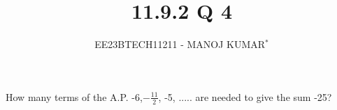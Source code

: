 \documentclass[journal,12pt,twocolumn]{IEEEtran}
\theoremstyle{remark}
\begin{document}

\vspace{3cm}

\title{11.9.2 Q 4}
\author{EE23BTECH11211 - MANOJ KUMAR$^{*}$%
}
\maketitle
\newpage
\bigskip

\renewcommand{\thefigure}{\theenumi}
\renewcommand{\thetable}{\theenumi}



How many terms of the A.P. -6,$-\frac{11}{2}$, -5, ..... are needed to give the sum -25?\\

\solution\\
\fi

\end{document}
